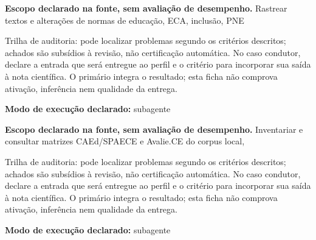 
\begin{descricao}
\textbf{Escopo declarado na fonte, sem avaliação de desempenho.}
Rastrear textos e alterações de normas de educação, ECA, inclusão, PNE
\end{descricao}

\begin{funcao}
Trilha de auditoria: pode localizar problemas segundo os critérios descritos; achados são subsídios à revisão, não certificação automática. No caso condutor, declare a entrada que será entregue ao perfil e o critério para incorporar sua saída à nota científica. O primário integra o resultado; esta ficha não comprova ativação, inferência nem qualidade da entrega.
\end{funcao}

\begin{arquitetura}
\textbf{Modo de execução declarado:} subagente
\end{arquitetura}


\begin{descricao}
\textbf{Escopo declarado na fonte, sem avaliação de desempenho.}
Inventariar e consultar matrizes CAEd/SPAECE e Avalie.CE do corpus local,
\end{descricao}

\begin{funcao}
Trilha de auditoria: pode localizar problemas segundo os critérios descritos; achados são subsídios à revisão, não certificação automática. No caso condutor, declare a entrada que será entregue ao perfil e o critério para incorporar sua saída à nota científica. O primário integra o resultado; esta ficha não comprova ativação, inferência nem qualidade da entrega.
\end{funcao}

\begin{arquitetura}
\textbf{Modo de execução declarado:} subagente
\end{arquitetura}

